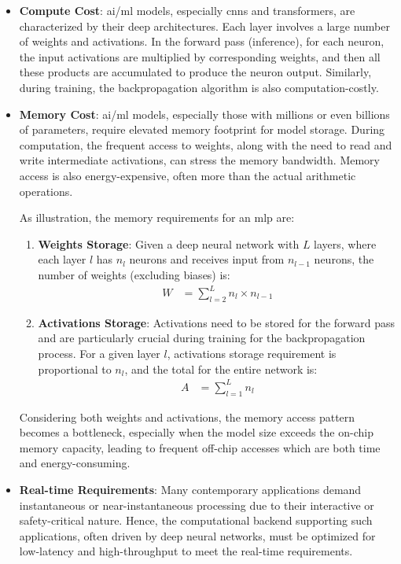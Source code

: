 \begin{itemize}
	\item \textbf{Compute Cost}: \gls{ai}/\gls{ml} models, especially \glspl{cnn} and transformers, are characterized by their deep architectures. Each layer involves a large number of weights and activations. In the forward pass (inference), for each neuron, the input activations are multiplied by corresponding weights, and then all these products are accumulated to produce the neuron output. Similarly, during training, the backpropagation algorithm is also computation-costly.
	
	\item \textbf{Memory Cost}: \gls{ai}/\gls{ml} models, especially those with millions or even billions of parameters, require elevated memory footprint for model storage. During computation, the frequent access to weights, along with the need to read and write intermediate activations, can stress the memory bandwidth. Memory access is also energy-expensive, often more than the actual arithmetic operations.
	
	As illustration, the memory requirements for an \gls{mlp} are:
	\begin{enumerate}
		\item \textbf{Weights Storage}: Given a deep neural network with \(L\) layers, where each layer \(l\) has \(n_l\) neurons and receives input from \(n_{l-1}\) neurons, the number of weights (excluding biases) is:
		\begin{align*}
		W &= \sum_{l=2}^{L} n_l \times n_{l-1}
		\end{align*}
		
		\item \textbf{Activations Storage}: Activations need to be stored for the forward pass and are particularly crucial during training for the backpropagation process. For a given layer \(l\), activations storage requirement is proportional to \(n_l\), and the total for the entire network is:
		\begin{align*}
		A &= \sum_{l=1}^{L} n_l
		\end{align*}
	\end{enumerate}
	Considering both weights and activations, the memory access pattern becomes a bottleneck, especially when the model size exceeds the on-chip memory capacity, leading to frequent off-chip accesses which are both time and energy-consuming.
	
	\item \textbf{Real-time Requirements}:
	Many contemporary applications demand instantaneous or near-instantaneous processing due to their interactive or safety-critical nature. Hence, the computational backend supporting such applications, often driven by deep neural networks, must be optimized for low-latency and high-throughput to meet the real-time requirements.
	

\end{itemize}
